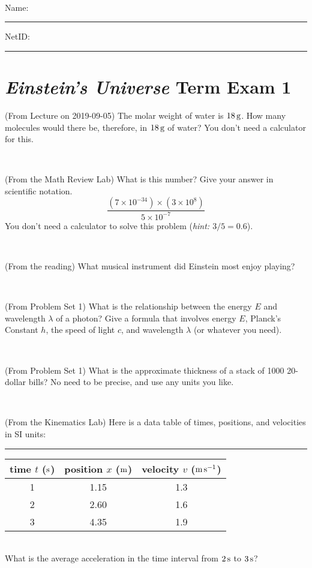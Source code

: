 \documentclass[12pt, letterpaper]{article}
\begin{document}
\vfill ~


\cleardoublepage



\noindent
Name: \rule[-1ex]{0.60\textwidth}{0.1pt}
NetID: \rule[-1ex]{0.20\textwidth}{0.1pt}

\section*{\textsl{Einstein's Universe} Term Exam 1}
\setcounter{problem}{1}


\begin{problem} (From Lecture on 2019-09-05)
The molar weight of water is $18\,\mathrm{g}$. How many molecules would there
be, therefore, in $18\,\mathrm{g}$ of water? You don't need a calculator for
this.
\end{problem}


\vfill ~

\begin{problem} (From the Math Review Lab)
What is this number? Give your answer in scientific notation.
$$
\frac{(7\times10^{-34})\times(3\times10^8)}{5\times10^{-7}}
$$
You don't need a calculator to solve this problem (\textit{hint: $3/5=0.6$}).
\end{problem}


\vfill ~

\begin{problem} (From the reading)
What musical instrument did Einstein most enjoy playing?
\end{problem}


\vfill ~

\begin{problem} (From Problem Set 1)
What is the relationship between the energy $E$ and wavelength
$\lambda$ of a photon? Give a formula that involves energy $E$,
Planck's Constant $h$, the speed of light $c$, and wavelength
$\lambda$ (or whatever you need).
\end{problem}

\vfill ~


\clearpage


\begin{problem} (From Problem Set 1)
What is the approximate thickness of a stack of 1000 20-dollar bills?
No need to be precise, and use any units you like.
\end{problem}


\vfill ~

\begin{problem} (From the Kinematics Lab)
Here is a data table of times, positions, and velocities in SI units:\\
\rule{1.0in}{0pt}\begin{tabular}{c|c|c}
time $t$ ($\mathrm{s}$) & position $x$ ($\mathrm{m}$) & velocity $v$ ($\mathrm{m}\,\mathrm{s}^{-1}$) \\
\hline
1 & 1.15 & 1.3 \\
2 & 2.60 & 1.6 \\
3 & 4.35 & 1.9 \\
\hline
\end{tabular}\\
What is the average acceleration in the time interval from $2\,\mathrm{s}$ to $3\,\mathrm{s}$?
\end{problem}
\end{document}
